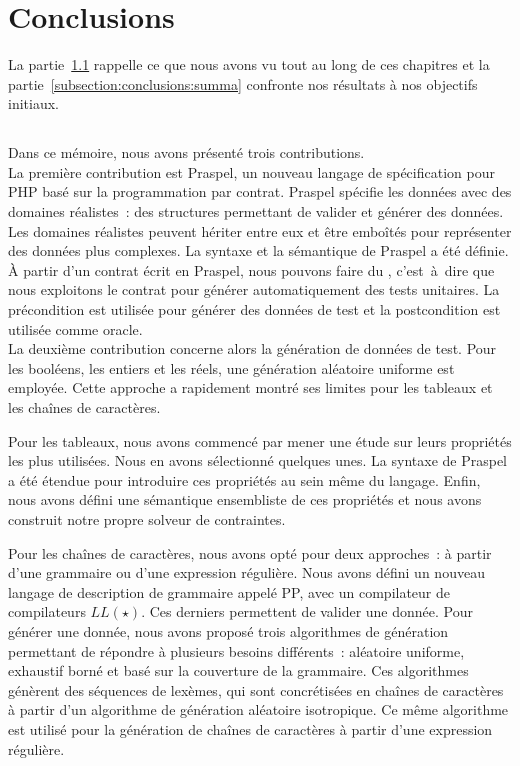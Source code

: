\section{Conclusions}
\label{section:conclusions:conclusions}

La partie~\ref{subsection:conclusions:recapitulare} rappelle ce que nous avons
vu tout au long de ces chapitres et la partie~\ref{subsection:conclusions:summa}
confronte nos résultats à nos objectifs initiaux.

\subsection{}
\label{subsection:conclusions:recapitulare}

Dans ce mémoire, nous avons présenté trois contributions. \\

La première contribution est Praspel, un nouveau langage de spécification pour
PHP basé sur la programmation par contrat. Praspel spécifie les données avec des
domaines réalistes~: des structures permettant de valider et générer des
données. Les domaines réalistes peuvent hériter entre eux et être emboîtés pour
représenter des données plus complexes. La syntaxe et la sémantique de Praspel a
été définie.  À partir d'un contrat écrit en Praspel, nous pouvons faire du
, c'est~à~dire que nous exploitons le contrat
pour générer automatiquement des tests unitaires. La précondition est utilisée
pour générer des données de test et la postcondition est utilisée comme oracle.
\\

La deuxième contribution concerne alors la génération de données de test. Pour
les booléens, les entiers et les réels, une génération aléatoire uniforme est
employée. Cette approche a rapidement montré ses limites pour les tableaux et
les chaînes de caractères.

Pour les tableaux, nous avons commencé par mener une étude sur leurs propriétés
les plus utilisées. Nous en avons sélectionné quelques unes. La syntaxe de
Praspel a été étendue pour introduire ces propriétés au sein même du langage.
Enfin, nous avons défini une sémantique ensembliste de ces propriétés et nous
avons construit notre propre solveur de contraintes.

Pour les chaînes de caractères, nous avons opté pour deux approches~: à partir
d'une grammaire ou d'une expression régulière. Nous avons défini un nouveau
langage de description de grammaire appelé PP, avec un compilateur de
compilateurs $LL(\star)$. Ces derniers permettent de valider une donnée. Pour
générer une donnée, nous avons proposé trois algorithmes de génération
permettant de répondre à plusieurs besoins différents~: aléatoire uniforme,
exhaustif borné et basé sur la couverture de la grammaire. Ces algorithmes
génèrent des séquences de lexèmes, qui sont concrétisées en chaînes de
caractères à partir d'un algorithme de génération aléatoire isotropique. Ce même
algorithme est utilisé pour la génération de chaînes de caractères à partir
d'une expression régulière.

